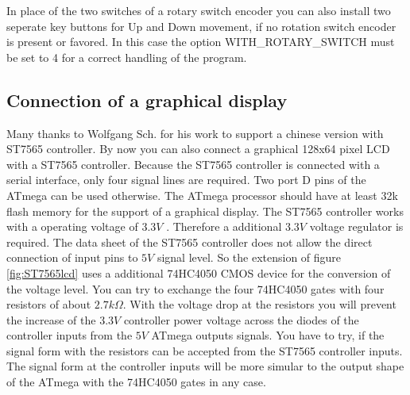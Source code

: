 In place of the two switches of a rotary switch encoder you can also install two seperate
key buttons for Up and Down movement, if no rotation switch encoder is present or favored.
In this case the option WITH\_ROTARY\_SWITCH must be set to 4 for a correct handling of
the program.

\subsection{Connection of a graphical display}

Many thanks to Wolfgang Sch. for his work to support a chinese version with ST7565 controller.
By now you can also connect a graphical 128x64 pixel LCD with a ST7565 controller.
Because the ST7565 controller is connected with a serial interface, only four signal
lines are required. Two port D pins of the ATmega can be used otherwise.
The ATmega processor should have at least 32k flash memory for the support of a graphical display.
The ST7565 controller works with a operating voltage of \(3.3V\) .
Therefore a additional \(3.3V\) voltage regulator is required.
The data sheet of the ST7565 controller does not allow the direct connection of input pins to
\(5V\) signal level. So the extension of figure \ref{fig:ST7565lcd} uses a additional 74HC4050 CMOS
device for the conversion of the voltage level.
You can try to exchange the four 74HC4050 gates with four resistors of about \(2.7k\Omega\).
With the voltage drop at the resistors you will prevent the increase of the \(3.3V\) controller power voltage 
across the diodes of the controller inputs from the \(5V\) ATmega outputs signals.
You have to try, if the signal form with the resistors can be accepted from the ST7565 controller inputs.
The signal form at the controller inputs will be more simular to the output shape of the ATmega with the 74HC4050 gates in any case.\\

